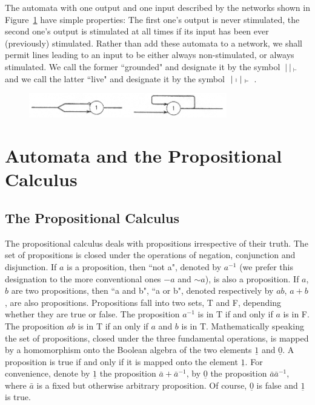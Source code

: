 \documentclass[twocolumn,preprintnumbers,amsmath,amssymb,floatfix]{revtex4}
\begin{document}
The automata with one output and one input described by the
networks shown in Figure~\ref{fig:3} have simple properties: The
first one's output is never stimulated, the second one's output is
stimulated at all times if its input has been ever (previously)
stimulated. Rather than add these automata to a network, we shall
permit lines leading to an input to be either always
non-stimulated, or always stimulated. We call the former
``grounded" and designate it by the symbol $~|~|~_\vdash~$ and we
call the latter ``live" and designate it by the symbol
$~|\shortmid|~_\vdash$~.

\begin{figure}[b]
\includegraphics[width=3.4in]{fig_3}
\caption{\label{fig:3}}
\end{figure}

\section{\label{sec:three}Automata and the Propositional Calculus}

\subsection{\label{sec:three1}The Propositional Calculus}

The propositional calculus deals with propositions irrespective of
their truth. The set of propositions is closed under the
operations of negation, conjunction and disjunction. If $a$ is a
proposition, then ``not a", denoted by $a^{-1}$ (we prefer this
designation to the more conventional ones $-a$ and $\sim{a}$), is
also a proposition. If $a$, $b$ are two propositions, then ``a and
b", ``a or b", denoted respectively by $ab$, $a+b$, are also
propositions. Propositions fall into two sets, T and F, depending
whether they are true or false. The proposition $a^{-1}$ is in T
if and only if $a$ is in F. The proposition $ab$ is in T if an
only if $a$ and $b$ is in T. Mathematically speaking the set of
propositions, closed under the three fundamental operations, is
mapped by a homomorphism onto the Boolean algebra of the two
elements $\underline{1}$ and $\underline{0}$. A proposition is
true if and only if it is mapped onto the element $\underline{1}$.
For convenience, denote by $\underline{1}$ the proposition
$\bar{a}+\bar{a}^{-1}$, by $\underline{0}$ the proposition
$\bar{a}\bar{a}^{-1}$, where $\bar{a}$ is a fixed but otherwise
arbitrary proposition. Of course, $\underline{0}$ is false and
$\underline{1}$ is true.
\end{document}
